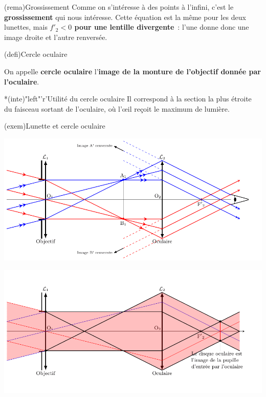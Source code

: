 \documentclass[../../main/main.tex]{subfiles}
\begin{document}
\begin{tcb}[label=rema:gross_lunette](rema){Grossissement}
	Comme on s'intéresse à des points à l'infini, c'est le \textbf{grossissement}
	qui nous intéresse. Cette équation est la même pour les deux lunettes, mais
	\textbf{$f'_2 < 0$ pour une lentille divergente}~: l'une donne donc une image
	droite et l'autre renversée.
\end{tcb}
\begin{tcbraster}[raster columns=2, raster equal height=rows]
	\begin{tcb}(defi){Cercle oculaire}

		On appelle \textbf{cercle oculaire} l'\textbf{image de la monture de
			l'objectif donnée par l'oculaire}.

	\end{tcb}
	\begin{tcb}*(inte)"left"'r'{Utilité du cercle oculaire}
		Il correspond à la section la plus étroite du faisceau sortant de
		l'oculaire, où l'œil reçoit le maximum de lumière.
	\end{tcb}
\end{tcbraster}
\begin{tcb}[label=exem:co](exem){Lunette et cercle oculaire}
	\begin{center}
		\includegraphics[width=.83\linewidth]{kepler_2obj}
	\end{center}
	\tcblower
	\begin{center}
		\includegraphics[width=.83\linewidth]{kepler_co}
	\end{center}
\end{tcb}
\end{document}
